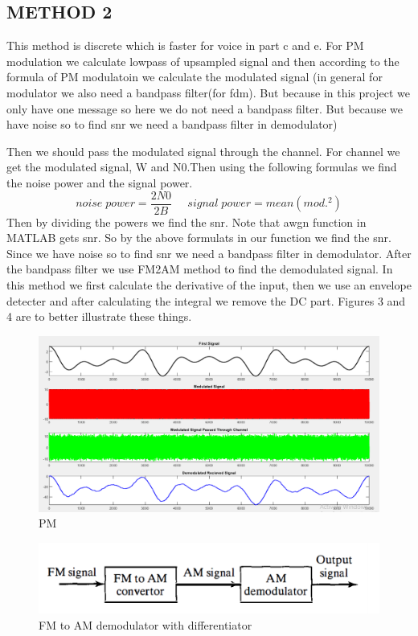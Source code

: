 \documentclass[11pt]{article}
\begin{document}
\begin{question}
\begin{subquestion}
{\section*{METHOD 2}
This method is discrete which is faster for voice in part c and e. For PM modulation we calculate lowpass of upsampled signal and then according to the formula of PM modulatoin we calculate the modulated signal (in general for modulator we also need a bandpass filter(for fdm). But because in this project we only have one message so here we do not need a bandpass filter. But because we have noise so to find snr we need a bandpass filter in demodulator)

Then we should pass the modulated signal through the channel. For channel we get the modulated signal, W and N0.Then using the following formulas we find the noise power and the signal power.
$$noise\;power = \frac{2N0}{2B} \;\;\;\;\; signal\;power = mean(mod.^2)$$
Then by dividing the powers we find the snr. Note that awgn function in MATLAB gets snr. So by the above formulats in our function we find the snr. \\

$$$$
Since we have noise so to find snr we need a bandpass filter in demodulator. After the bandpass filter we use FM2AM method to find the demodulated signal. In this method we first calculate the derivative of the input, then we use an envelope detecter and after calculating the integral we remove the DC part. Figures 3 and 4 are to better illustrate these things. \\

}
\begin{figure}[H]
\centering
\includegraphics[scale=0.6]{Fig/2.png}
\caption{PM}\label{fig:MainPM}
\end{figure}

\begin{figure}[H]
\centering
\includegraphics[scale=1]{Fig/3.png}
\caption{FM to AM demodulator with differentiator}
\end{figure}


\end{subquestion}
\end{question}
\end{document}
